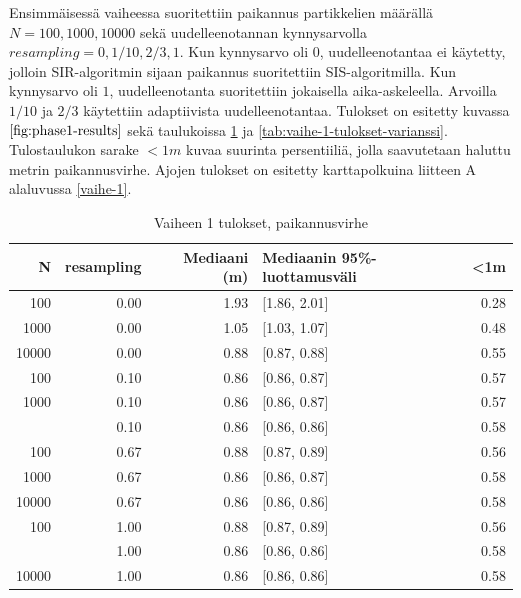 \documentclass[
  12pt,
  a4paper, twoside]{book}
\begin{document}
Ensimmäisessä vaiheessa suoritettiin paikannus partikkelien määrällä \(N={100,1000,10000}\) sekä uudelleenotannan kynnysarvolla \(resampling={0,1/10,2/3,1}\). Kun kynnysarvo oli \(0\), uudelleenotantaa ei käytetty, jolloin SIR-algoritmin sijaan paikannus suoritettiin SIS-algoritmilla. Kun kynnysarvo oli \(1\), uudelleenotanta suoritettiin jokaisella aika-askeleella. Arvoilla \(1/10\) ja \(2/3\) käytettiin adaptiivista uudelleenotantaa. Tulokset on esitetty kuvassa \(\ref{fig:phase1-results}\) sekä taulukoissa \ref{tab:vaihe-1-tulokset} ja \ref{tab:vaihe-1-tulokset-varianssi}. Tulostaulukon sarake \(<1m\) kuvaa suurinta persentiiliä, jolla saavutetaan haluttu metrin paikannusvirhe. Ajojen tulokset on esitetty karttapolkuina liitteen A alaluvussa \ref{vaihe-1}.

\begin{table}

\caption{\label{tab:vaihe-1-tulokset}Vaiheen 1 tulokset, paikannusvirhe}
\centering
\begin{tabular}[t]{rrrlr}
\toprule
N & resampling & Mediaani (m) & Mediaanin 95\%-luottamusväli & <1m\\
\midrule
100 & 0.00 & 1.93 & {}[1.86, 2.01] & 0.28\\
1000 & 0.00 & 1.05 & {}[1.03, 1.07] & 0.48\\
10000 & 0.00 & 0.88 & {}[0.87, 0.88] & 0.55\\
100 & 0.10 & 0.86 & {}[0.86, 0.87] & 0.57\\
1000 & 0.10 & 0.86 & {}[0.86, 0.87] & 0.57\\
\addlinespace
10000 & 0.10 & 0.86 & {}[0.86, 0.86] & 0.58\\
100 & 0.67 & 0.88 & {}[0.87, 0.89] & 0.56\\
1000 & 0.67 & 0.86 & {}[0.86, 0.87] & 0.58\\
10000 & 0.67 & 0.86 & {}[0.86, 0.86] & 0.58\\
100 & 1.00 & 0.88 & {}[0.87, 0.89] & 0.56\\
\addlinespace
1000 & 1.00 & 0.86 & {}[0.86, 0.86] & 0.58\\
10000 & 1.00 & 0.86 & {}[0.86, 0.86] & 0.58\\
\bottomrule
\end{tabular}
\end{table}
\end{document}

